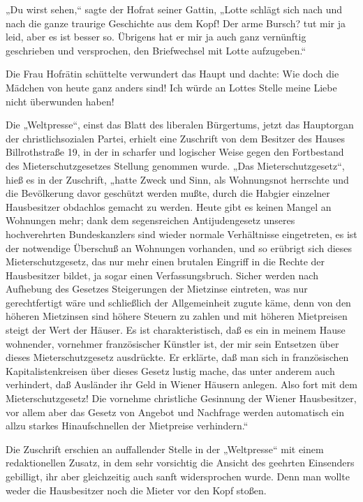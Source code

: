 „Du wirst sehen,“ sagte der Hofrat seiner Gattin, „Lotte schlägt
sich nach und nach die ganze traurige Geschichte aus dem Kopf! Der
arme Bursch? tut mir ja leid, aber es ist besser so. Übrigens hat
er mir ja auch ganz vernünftig geschrieben und versprochen, den
Briefwechsel mit Lotte aufzugeben.“

Die Frau Hofrätin schüttelte verwundert das Haupt und dachte: Wie
doch die Mädchen von heute ganz anders sind! Ich würde an Lottes
Stelle meine Liebe nicht überwunden haben!

\tb{* * *}
Die „Weltpresse“, einst das Blatt des liberalen
Bürgertums, jetzt das Hauptorgan der christlichsozialen Partei,
erhielt eine Zuschrift von dem Besitzer des Hauses Billrothstraße
19, in der in scharfer und logischer Weise gegen den Fortbestand
des Mieterschutzgesetzes Stellung genommen wurde. „Das
Mieterschutzgesetz“, hieß es in der Zuschrift, „hatte Zweck und
Sinn, als Wohnungsnot herrschte und die Bevölkerung davor geschützt
werden mußte, durch die Habgier einzelner Hausbesitzer obdachlos
gemacht zu werden. Heute gibt es keinen Mangel an Wohnungen mehr;
dank dem segensreichen Antijudengesetz unseres hochverehrten
Bundeskanzlers sind wieder normale Verhältnisse eingetreten, es ist
der notwendige Überschuß an Wohnungen vorhanden, und so erübrigt
sich dieses Mieterschutzgesetz, das nur mehr einen brutalen
Eingriff in die Rechte der Hausbesitzer bildet, ja sogar einen
Verfassungsbruch. Sicher werden nach Aufhebung des Gesetzes
Steigerungen der Mietzinse eintreten, was nur gerechtfertigt wäre
und schließlich der Allgemeinheit zugute käme, denn von den höheren
Mietzinsen sind höhere Steuern zu zahlen und mit höheren
Mietpreisen steigt der Wert der Häuser. Es ist charakteristisch,
daß es ein in meinem Hause wohnender, vornehmer französischer
Künstler ist, der mir sein Entsetzen über dieses Mieterschutzgesetz
ausdrückte. Er erklärte, daß man sich in französischen
Kapitalistenkreisen über dieses Gesetz lustig mache, das unter
anderem auch verhindert, daß Ausländer ihr Geld in Wiener Häusern
anlegen. Also fort mit dem Mieterschutzgesetz! Die vornehme
christliche Gesinnung der Wiener Hausbesitzer, vor allem aber das
Gesetz  von Angebot und Nachfrage werden automatisch
ein allzu starkes Hinaufschnellen der Mietpreise verhindern.“

Die Zuschrift erschien an auffallender Stelle in der „Weltpresse“
mit einem redaktionellen Zusatz, in dem sehr vorsichtig die Ansicht
des geehrten Einsenders gebilligt, ihr aber gleichzeitig auch sanft
widersprochen wurde. Denn man wollte weder die Hausbesitzer noch
die Mieter vor den Kopf stoßen.

